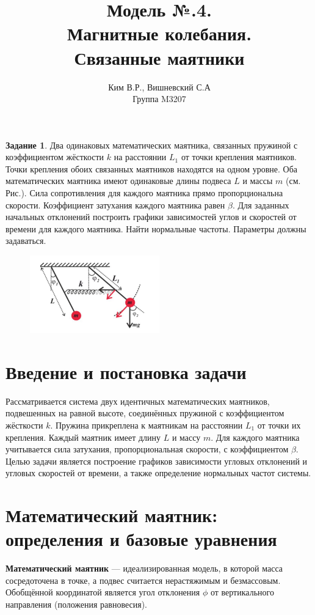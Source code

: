 \documentclass[a4paper,11pt]{article}
\title{Модель №.4. \\ Магнитные колебания. \\ Связанные маятники }
\author{Ким В.Р., Вишневский С.А \\ Группа M3207 }
\date{}
\theoremstyle{definition}
\newtheorem*{task}{Задание}\setlength{\parindent}{0pt}
\begin{document}
\maketitle

\begin{task}
    Два одинаковых математических маятника, связанных пружиной с коэффициентом 
    жёсткости \(k\) на расстоянии \(L_1\) от точки крепления маятников. 
    Точки крепления обоих связанных маятников находятся на одном уровне. 
    Оба математических маятника имеют одинаковые длины подвеса \(L\) и массы \(m\) 
    (см. Рис.). 
    Сила сопротивления для каждого маятника прямо пропорциональна скорости. 
    Коэффициент затухания каждого маятника равен \(\beta\). Для заданных начальных 
    отклонений построить графики зависимостей углов и скоростей от времени 
    для каждого маятника. Найти нормальные частоты. 
    Параметры должны задаваться.

    \begin{figure}[H]
        \centering
        \includegraphics[width=0.5\textwidth]{4. Connected pendulum/task}\label{fig:figure}
    \end{figure}

\end{task}


\section*{Введение и постановка задачи}
Рассматривается система двух идентичных математических маятников, подвешенных на равной высоте, соединённых 
пружиной с коэффициентом жёсткости \( k \). Пружина прикреплена к маятникам на расстоянии \( L_1 \) от точки 
их крепления. Каждый маятник имеет длину \( L \) и массу \( m \). Для каждого маятника учитывается сила 
затухания, пропорциональная скорости, с коэффициентом \(\beta\).
Целью задачи является построение графиков зависимости угловых отклонений и угловых скоростей от времени,
а также определение нормальных частот системы.



\section*{Математический маятник: определения и базовые уравнения}
\textbf{Математический маятник} --- идеализированная модель, в которой масса сосредоточена в точке, а подвес 
считается нерастяжимым и безмассовым. Обобщённой координатой является угол отклонения \(\phi\) от вертикального 
направления (положения равновесия).
\end{document}
